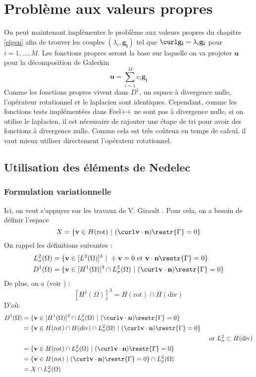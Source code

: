 \chapter{Problème aux valeurs propres}
On peut maintenant implémenter le problème aux valeurs propres du chapitre \ref{eigen} afin de trouver les couples $(\lambda_i,\mathbf{g_i})$ tel que $\curl\mathbf{g_i}=\lambda_i\mathbf{g_i}$ pour $i=1,\dots,M$. Les fonctions propres seront la base sur laquelle on va projeter $\mathbf{u}$ pour la décomposition de Galerkin \[ \mathbf{u}=\sum_{i=1}^M c_i\mathbf{g_i} \]
Comme les fonctions propres vivent dans $D^1$, un espace à divergence nulle, l'opérateur rotationnel et le laplacien sont identiques. Cependant, comme les fonctions tests implémentées dans Feel++ ne sont pas à divergence nulle, si on utilise le laplacien, il est nécessaire de rajouter une étape de tri pour avoir des fonctions à divergence nulle. Comme cela est très coûteux en temps de calcul, il vaut mieux utiliser directement l'opérateur rotationnel.

\section{Utilisation des éléments de Nedelec}
\subsection{Formulation variationnelle}
Ici, on veut s'appuyer sur les travaux de V. Girault \cite{girault90-1}. Pour cela, on a besoin de définir l'espace \[X = \{\mathbf{v}\in H(\mathrm{rot})\ |\ (\curl\mathbf{v}\cdot\mathbf{n})\restr{\Gamma}=0 \}\]
On rappel les définitions suivantes :
\begin{align*}
L^2_\sigma(\Omega) &= \{\mathbf{v} \in [L^2(\Omega)]^3\ |\ \div \mathbf{v} = 0\text{ et }\mathbf{v}\cdot \mathbf{n}\restr{\Gamma} = 0 \}\\
D^1(\Omega) &= \{\mathbf{v} \in [H^1(\Omega)]^3\cap L^2_\sigma(\Omega)\ |\ (\curl \mathbf{v}\cdot \mathbf{n})\restr{\Gamma} = 0  \}
\end{align*}
De plus, on a (voir \cite{Girault79}) :
\[ [H^1(\Omega)]^3=H(\mathrm{rot})\cap H(\mathrm{div}) \]
D'où:
\begin{align*}
D^1(\Omega) &= \{\mathbf{v}\in [H^1(\Omega)]^3\cap L^2_\sigma(\Omega)\ |\ (\curl \mathbf{v}\cdot \mathbf{n})\restr{\Gamma} = 0  \}&\\
&=\{\mathbf{v}\in H(\mathrm{rot})\cap H(\mathrm{div})\cap L^2_\sigma(\Omega)\ |\ (\curl \mathbf{v}\cdot \mathbf{n})\restr{\Gamma} = 0  \}&\\
&&\text{ or }L^2_\sigma\subset H(\mathrm{div})\\
&=\{\mathbf{v}\in H(\mathrm{rot})\cap L^2_\sigma(\Omega)\ |\ (\curl \mathbf{v}\cdot \mathbf{n})\restr{\Gamma} = 0  \}&\\
&=\{\mathbf{v}\in H(\mathrm{rot})\ |\ (\curl \mathbf{v}\cdot \mathbf{n})\restr{\Gamma} = 0  \}\cap L^2_\sigma(\Omega)&\\
&=X\cap L^2_\sigma(\Omega)&
\end{align*}

